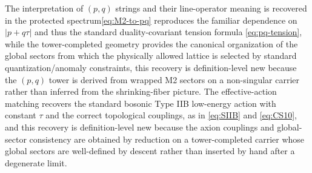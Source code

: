 \documentclass[11pt]{article}
\theoremstyle{remark}
\begin{document}
The interpretation of \((p,q)\) strings and their line-operator meaning is recovered in the protected spectrum\:\eqref{eq:M2-to-pq} reproduces the familiar dependence on \(|p+q\tau|\) and thus the standard duality-covariant tension formula \eqref{eq:pq-tension}, while the tower-completed geometry provides the canonical organization of the global sectors from which the physically allowed lattice is selected by standard quantization/anomaly constraints, this recovery is definition-level new because the \((p,q)\) tower is derived from wrapped M2 sectors on a non-singular carrier rather than inferred from the shrinking-fiber picture. The effective-action matching recovers the standard bosonic Type IIB low-energy action with constant \(\tau\) and the correct topological couplings, as in \eqref{eq:SIIB} and \eqref{eq:CS10}, and this recovery is definition-level new because the axion couplings and global-sector consistency are obtained by reduction on a tower-completed carrier whose global sectors are well-defined by descent rather than inserted by hand after a degenerate limit.
\end{document}
